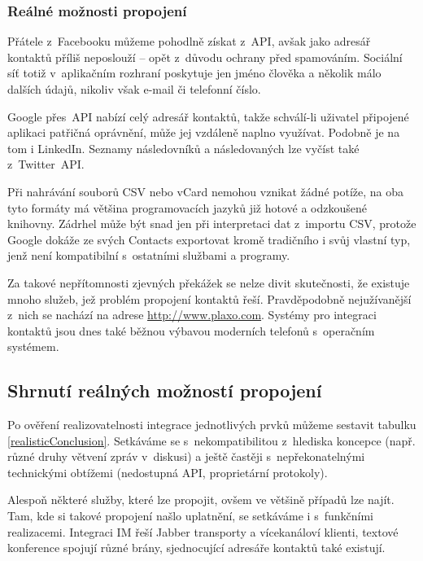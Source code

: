 \documentclass[12pt,oneside,final]{fithesis2}
\begin{document}
\subsubsection*{Reálné možnosti propojení}
Přátele z~Facebooku můžeme pohodlně získat z~API, avšak jako adresář kontaktů příliš neposlouží -- opět z~důvodu ochrany před spamováním. Sociální síť totiž v~aplikačním rozhraní poskytuje jen jméno člověka a několik málo dalších údajů, nikoliv však e-mail či telefonní číslo.

Google přes~API nabízí celý adresář kontaktů, takže schválí-li uživatel připojené aplikaci patřičná oprávnění, může jej vzdáleně naplno využívat. Podobně je na tom i LinkedIn. Seznamy následovníků a následovaných lze vyčíst také z~Twitter~API.

Při nahrávání souborů CSV nebo vCard nemohou vznikat žádné potíže, na oba tyto formáty má většina programovacích jazyků již hotové a odzkoušené knihovny. Zádrhel může být snad jen při interpretaci dat z~importu CSV, protože Google dokáže ze svých Contacts exportovat kromě tradičního i svůj vlastní typ, jenž není kompatibilní s~ostatními službami a programy.

Za takové nepřítomnosti zjevných překážek se nelze divit sku\-teč\-nos\-ti, že exis\-tu\-je mno\-ho služeb, jež problém propojení kontaktů řeší. Pravděpodobně nejužívanější z~nich se nachází na adrese \url{http://www.plaxo.com}. Systémy pro integraci kontaktů jsou dnes také běžnou výbavou moderních telefonů s~operačním systémem.

\subsection{Shrnutí reálných možností propojení}
Po ověření realizovatelnosti integrace jednotlivých prvků můžeme sestavit tabulku \ref{realisticConclusion}. Setkáváme se s~nekompatibilitou z~hlediska koncepce (např. různé druhy větvení zpráv v~diskusi) a ještě častěji s~nepřekonatelnými technickými obtížemi (nedostupná API, proprietární protokoly).

Alespoň některé služby, které lze propojit, ovšem ve většině případů lze najít. Tam, kde si takové propojení našlo uplatnění, se setkáváme i s~funkčními realizacemi. Integraci IM řeší Jabber transporty a vícekanáloví klienti, textové konference spojují různé brány, sjednocující adresáře kontaktů také existují.
\end{document}
